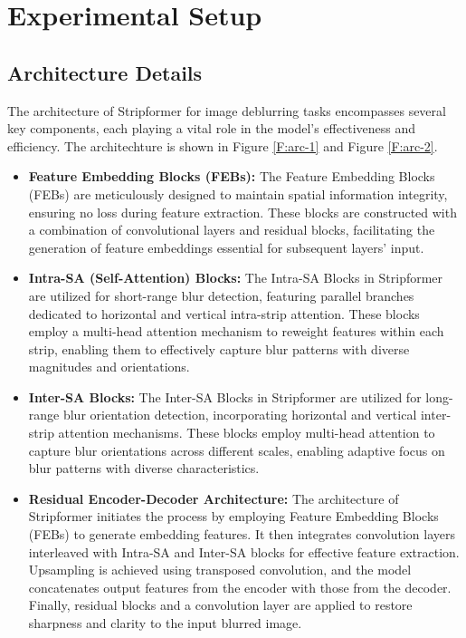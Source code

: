\documentclass[12pt, a4paper, twoside]{article}
\begin{document}
	\section{Experimental Setup}
		\subsection{Architecture Details}
			The architecture of Stripformer\cite{paper} for image deblurring tasks encompasses several key components, each playing a vital role in the model's effectiveness and efficiency. The architechture is shown in Figure \ref{F:arc-1} and Figure \ref{F:arc-2}.
			
			\begin{itemize}
				\item \textbf{Feature Embedding Blocks (FEBs):} The Feature Embedding Blocks (FEBs) are meticulously designed to maintain spatial information integrity, ensuring no loss during feature extraction. These blocks are constructed with a combination of convolutional layers and residual blocks, facilitating the generation of feature embeddings essential for subsequent layers' input.
				
				\item \textbf{Intra-SA (Self-Attention) Blocks:} The Intra-SA Blocks in Stripformer are utilized for short-range blur detection, featuring parallel branches dedicated to horizontal and vertical intra-strip attention. These blocks employ a multi-head attention mechanism to reweight features within each strip, enabling them to effectively capture blur patterns with diverse magnitudes and orientations.
				
				\item \textbf{Inter-SA Blocks:} The Inter-SA Blocks in Stripformer are utilized for long-range blur orientation detection, incorporating horizontal and vertical inter-strip attention mechanisms. These blocks employ multi-head attention to capture blur orientations across different scales, enabling adaptive focus on blur patterns with diverse characteristics.

				\item \textbf{Residual Encoder-Decoder Architecture:} The architecture of Stripformer initiates the process by employing Feature Embedding Blocks (FEBs) to generate embedding features. It then integrates convolution layers interleaved with Intra-SA and Inter-SA blocks for effective feature extraction. Upsampling is achieved using transposed convolution, and the model concatenates output features from the encoder with those from the decoder. Finally, residual blocks and a convolution layer are applied to restore sharpness and clarity to the input blurred image.
				
			\end{itemize}
			
\end{document}
